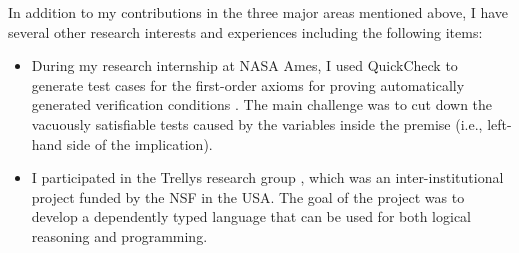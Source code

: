 \documentclass[11pt,letterpaper]{article}
\begin{document}
\begin{description}
\end{description}

\vspace*{1.5ex}
In addition to my contributions in the three major areas mentioned
above, I have several other research interests and experiences including
the following items: 
\begin{itemize}
\item During my research internship at NASA Ames, I used QuickCheck
	to generate test cases for the first-order axioms for proving
	automatically generated verification conditions \cite{Ahn10,Ahn13}.
	The main challenge was to cut down the vacuously satisfiable
	tests caused by the variables inside the premise (i.e., left-hand side
	of the implication).
\item I participated in the Trellys research group \cite{Kimmell12,Vilhelm12},
	which was an inter-institutional project funded by the NSF
	in the USA. The goal of the project was to develop
	a dependently typed language that can be used for both
	logical reasoning and programming.

\end{itemize}
\end{document}
